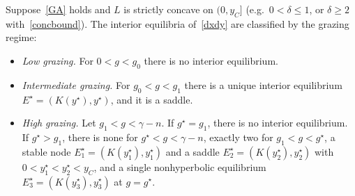 \documentclass[10pt,a4paper]{amsart}
\begin{document}
\begin{thm}\label{thm:classification}
Suppose~\eqref{GA} holds and $L$ is strictly concave on $(0,y_C]$ (e.g.\ $0<\delta\le1$, or $\delta\ge2$ with~\eqref{concbound}). The interior equilibria of~\eqref{dxdy} are classified by the grazing regime:
\begin{itemize}
\item[\textup{(i)}] \emph{Low grazing.} For $0<g<g_0$ there is no interior equilibrium.
\item[\textup{(ii)}] \emph{Intermediate grazing.} For $g_0<g<g_1$ there is a unique interior equilibrium $E^\star=(K(y^\star),y^\star)$, and it is a saddle.
\item[\textup{(iii)}] \emph{High grazing.} Let $g_1<g<\gamma-n$. If $g^\star=g_1$, there is no interior equilibrium. If $g^\star>g_1$, there is none for $g^\star<g<\gamma-n$, exactly two for $g_1<g<g^\star$, a stable node $E_1^\star=(K(y_1^\star),y_1^\star)$ and a saddle $E_2^\star=(K(y_2^\star),y_2^\star)$ with $0<y_1^\star<y_2^\star<y_C$, and a single nonhyperbolic equilibrium $E_3^\star=(K(y_3^\star),y_3^\star)$ at $g=g^\star$.
\end{itemize}
\end{thm}
\end{document}
